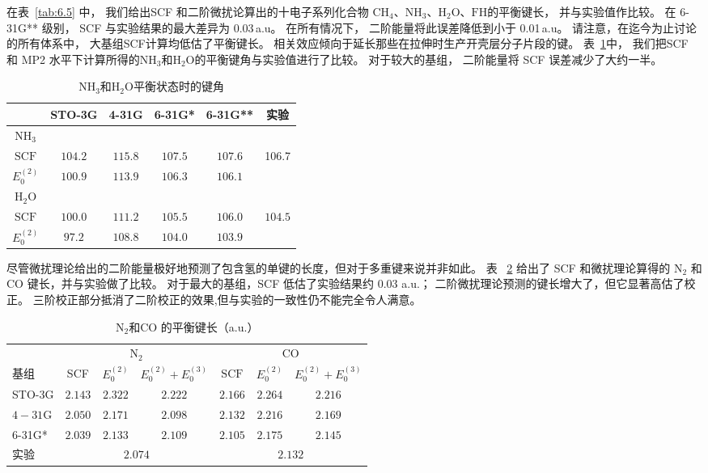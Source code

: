 在表~\ref{tab:6.5} 中，
我们给出SCF 和二阶微扰论算出的十电子系列化合物
$\mathrm{CH}_4$、$\mathrm{NH}_3$、$\mathrm{H_2O}$、$\mathrm{FH}$的平衡键长，
并与实验值作比较。
在 6-31G** 级别，
SCF 与实验结果的最大差异为 0.03\,a.u。
在所有情况下，
二阶能量将此误差降低到小于 0.01\,a.u。
请注意，在迄今为止讨论的所有体系中，
大基组SCF计算均低估了平衡键长。
相关效应倾向于延长那些在拉伸时生产开壳层分子片段的键。 
表~\ref{tab:6.6}中，
我们把SCF 和 MP2 水平下计算所得的$\mathrm{NH}_3$和$\mathrm{H_2O}$的平衡键角与实验值进行了比较。 
对于较大的基组，
二阶能量将 SCF 误差减少了大约一半。
\begin{table}
	\centering
	\caption{$\mathrm{NH_3}$和$\mathrm{H_2O}$平衡状态时的键角}
	\begin{threeparttable}
	\begin{tabular}{cccccc}
		\hline & STO-3G & 4-31G & 6-31G* & 6-31G** & 实验 \\
		\hline $\mathrm{NH}_3$ & & & & & \\
		$\mathrm{SCF}$ & $104.2$ & $115.8$ & $107.5$ & $107.6$ & \multirow{2}{*}{106.7} \\
		$E_0^{(2)}$ & $100.9$ & $113.9$ & $106.3$ & $106.1$ & \\
		$\mathrm{H}_2 \mathrm{O}$ & & & & & \\
		$\mathrm{SCF}$ & $100.0$ & $111.2$ & $105.5$ & $106.0$ & \multirow{2}{*}{$104.5$} \\
		$E_0^{(2)}$ & $97.2$ & $108.8$ & $104.0$ & $103.9$ & \\
		\hline
	\end{tabular}
	\end{threeparttable}
	\label{tab:6.6}
\end{table}

尽管微扰理论给出的二阶能量极好地预测了包含氢的单键的长度，但对于多重键来说并非如此。 表 ~\ref{tab:6.7} 给出了 SCF 和微扰理论算得的 $\mathrm{N_2}$ 和 $\mathrm{CO}$ 键长，并与实验做了比较。 对于最大的基组，SCF 低估了实验结果约 0.03 a.u.； 二阶微扰理论预测的键长增大了，但它显著高估了校正。 三阶校正部分抵消了二阶校正的效果,但与实验的一致性仍不能完全令人满意。
\begin{table}\centering
	\caption{$\mathrm{N}_2$和$\mathrm{CO}$ 的平衡键长（a.u.）}
	\begin{tabular}{lcccccc}
		\hline 
		& \multicolumn{3}{c}{$\mathrm{N}_2$} &  \multicolumn{3}{c}{$\mathrm{CO}$} \\
		\cline { 2 - 4 } \cline { 5 - 7 } 基组 & SCF & $E_0^{(2)}$ & $E_0^{(2)}+E_0^{(3)}$ &  $\mathrm{SCF}$ & $E_0^{(2)}$ & $E_0^{(2)}+E_0^{(3)}$ \\
		\hline STO-3G & $2.143$ & $2.322$ & $2.222$ &  $2.166$ & $2.264$ & $2.216$ \\
		$4-31 \mathrm{G}$ & $2.050$ & $2.171$ & $2.098$  & $2.132$ & $2.216$ & $2.169$ \\
		6-31G* & $2.039$ & $2.133$ & $2.109$ &  $2.105$ & $2.175$ & $2.145$ \\
		实验 & \multicolumn{3}{c}{$2.074$}& \multicolumn{3}{c}{$2.132$}  \\
		\hline
	\end{tabular}
\label{tab:6.7}
\end{table}

